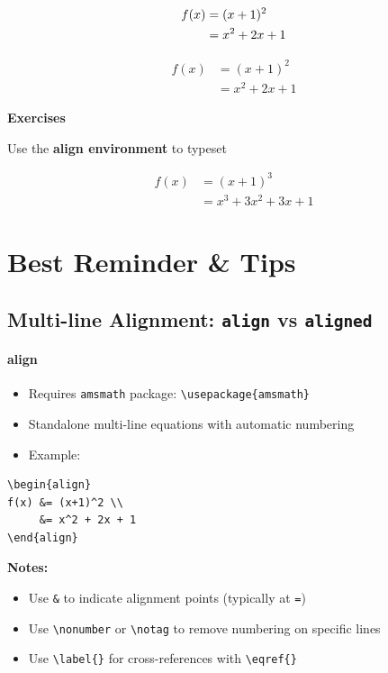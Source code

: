 \documentclass[12pt,a4paper]{article}
\begin{document}
\begin{align}
f(x) &= (x+1)^2 \notag \\
     &= x^2 + 2x + 1
\end{align}

\begin{equation}
\begin{aligned}
f(x) &= (x+1)^2 \\
     &= x^2 + 2x + 1
\end{aligned}
\end{equation}

\textbf{\color[HTML]{CA6F1E}Exercises}

Use the \textbf{align environment} to typeset

\begin{align}
f(x)&=(x+1)^3\\
&=x^3+3x^2+3x+1
\end{align}

\section{\color[HTML]{C0392B}Best Reminder \& Tips}

\subsection{Multi-line Alignment: \texttt{align} vs \texttt{aligned}}

\paragraph{align}

\begin{itemize}
    \item Requires \texttt{amsmath} package: \verb|\usepackage{amsmath}|
    \item Standalone multi-line equations with automatic numbering
    \item Example:
\end{itemize}

\begin{verbatim}
\begin{align}
f(x) &= (x+1)^2 \\
     &= x^2 + 2x + 1
\end{align}
\end{verbatim}

\textbf{Notes:}
\begin{itemize}
    \item Use \verb|&| to indicate alignment points (typically at \verb|=|)
    \item Use \verb|\nonumber| or \verb|\notag| to remove numbering on specific lines
    \item Use \verb|\label{}| for cross-references with \verb|\eqref{}|
\end{itemize}
\end{document}
